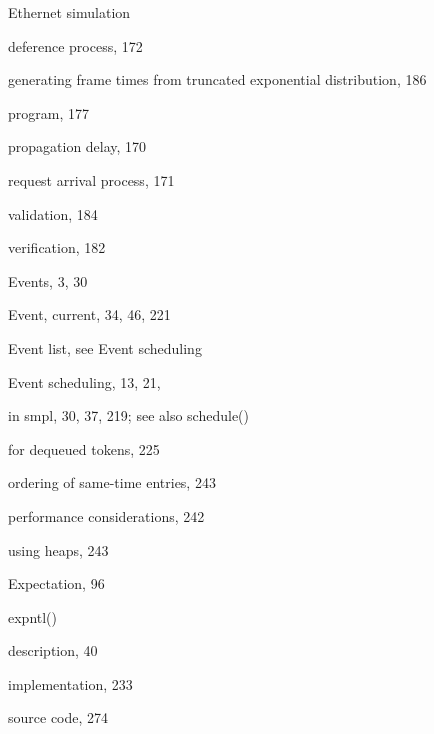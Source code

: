 \noindent Ethernet simulation\par
\quad deference process, 172\par
\quad generating frame times from truncated exponential distribution, 186\par
\quad program, 177\par
\quad propagation delay, 170\par
\quad request arrival process, 171\par
\quad validation, 184\par
\quad verification, 182\par
\noindent Events, 3, 30\par
\noindent Event, current, 34, 46, 221\par
\noindent Event list, see Event scheduling\par
\noindent Event scheduling, 13, 21,\par
\quad in smpl, 30, 37, 219; see also schedule()\par
\quad for dequeued tokens, 225\par
\quad ordering of same-time entries, 243\par
\quad performance considerations, 242\par
\quad using heaps, 243\par
\noindent Expectation, 96\par
\noindent expntl()\par
\quad description, 40\par
\quad implementation, 233\par
\quad source code, 274\par

